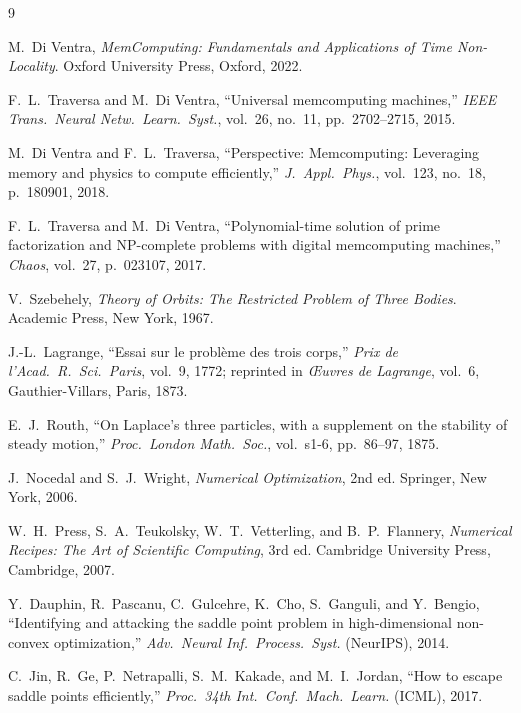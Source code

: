 \documentclass[10pt,twocolumn]{article}
\begin{document}
\clearpage
\onecolumn

\begin{thebibliography}{9}
\setlength{\itemsep}{2pt}
\setlength{\parsep}{0pt}
\setlength{\parskip}{0pt}

M.~Di Ventra,
\textit{MemComputing: Fundamentals and Applications of Time Non-Locality}.
Oxford University Press, Oxford, 2022.

F.~L.~Traversa and M.~Di Ventra,
``Universal memcomputing machines,''
\textit{IEEE Trans.\ Neural Netw.\ Learn.\ Syst.},
vol.~26, no.~11, pp.~2702--2715, 2015.

M.~Di Ventra and F.~L.~Traversa,
``Perspective: Memcomputing: Leveraging memory and physics to compute
efficiently,''
\textit{J.~Appl.\ Phys.}, vol.~123, no.~18, p.~180901, 2018.

F.~L.~Traversa and M.~Di Ventra,
``Polynomial-time solution of prime factorization and NP-complete problems
with digital memcomputing machines,''
\textit{Chaos}, vol.~27, p.~023107, 2017.

V.~Szebehely,
\textit{Theory of Orbits: The Restricted Problem of Three Bodies}.
Academic Press, New York, 1967.

J.-L.~Lagrange,
``Essai sur le probl\`{e}me des trois corps,''
\textit{Prix de l'Acad.\ R.\ Sci.\ Paris}, vol.~9, 1772;
reprinted in \textit{\OE uvres de Lagrange}, vol.~6,
Gauthier-Villars, Paris, 1873.

E.~J.~Routh,
``On Laplace's three particles, with a supplement on the stability of
steady motion,''
\textit{Proc.\ London Math.\ Soc.}, vol.~s1-6, pp.~86--97, 1875.

J.~Nocedal and S.~J.~Wright,
\textit{Numerical Optimization}, 2nd ed.
Springer, New York, 2006.

W.~H.~Press, S.~A.~Teukolsky, W.~T.~Vetterling, and B.~P.~Flannery,
\textit{Numerical Recipes: The Art of Scientific Computing}, 3rd ed.
Cambridge University Press, Cambridge, 2007.

Y.~Dauphin, R.~Pascanu, C.~Gulcehre, K.~Cho, S.~Ganguli, and Y.~Bengio,
``Identifying and attacking the saddle point problem in high-dimensional
non-convex optimization,''
\textit{Adv.\ Neural Inf.\ Process.\ Syst.} (NeurIPS), 2014.

C.~Jin, R.~Ge, P.~Netrapalli, S.~M.~Kakade, and M.~I.~Jordan,
``How to escape saddle points efficiently,''
\textit{Proc.\ 34th Int.\ Conf.\ Mach.\ Learn.} (ICML), 2017.


\end{thebibliography}
\end{document}
